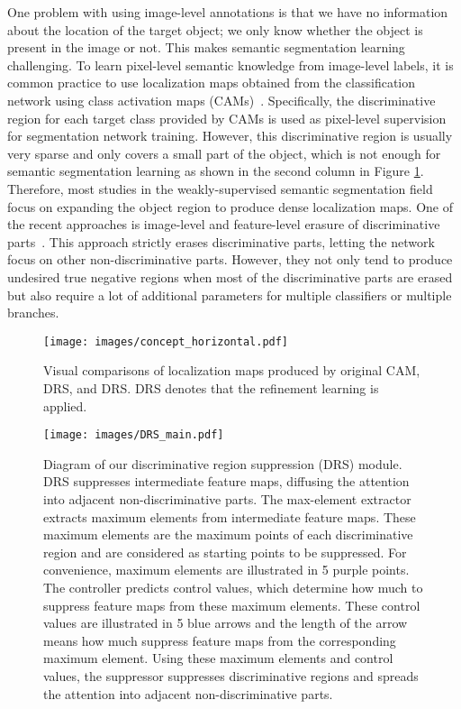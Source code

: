 \documentclass[letterpaper]{article} \usepackage{aaai21}  \usepackage{times}  \usepackage{helvet} \usepackage{courier}  \usepackage[hyphens]{url}  \usepackage{graphicx} \urlstyle{rm} \def\UrlFont{\rm}  \usepackage{natbib}  \usepackage{caption} \frenchspacing  \setlength{\pdfpagewidth}{8.5in}  \setlength{\pdfpageheight}{11in}
\begin{document}
One problem with using image-level annotations is that we have no information about the location of the target object; we only know whether the object is present in the image or not.
This makes semantic segmentation learning challenging.
To learn pixel-level semantic knowledge from image-level labels, it is common practice to use localization maps obtained from the classification network using class activation maps (CAMs)~\cite{zhou2016learning}. 
Specifically, the discriminative region for each target class provided by CAMs is used as pixel-level supervision for segmentation network training.
However, this discriminative region is usually very sparse and only covers a small part of the object, which is not enough for semantic segmentation learning as shown in the second column in Figure \ref{figure:concept}. 
Therefore, most studies in the weakly-supervised semantic segmentation field focus on expanding the object region to produce dense localization maps.
One of the recent approaches is image-level and feature-level erasure of discriminative parts~\cite{wei2017object, li2018tell, hou2018self}.
This approach strictly erases discriminative parts, letting the network focus on other non-discriminative parts.
However, they not only tend to produce undesired true negative regions when most of the discriminative parts are erased but also require a lot of additional parameters for multiple classifiers or multiple branches.


\begin{figure}[t]
    \centering

    \texttt{[image: images/concept\_horizontal.pdf]}
    \caption{Visual comparisons of localization maps produced by original CAM, DRS, and DRS. DRS denotes that the refinement learning is applied.}
    \label{figure:concept}
\end{figure}



\begin{figure*}[t]
    \centering
    \texttt{[image: images/DRS\_main.pdf]}
    \caption{
        Diagram of our discriminative region suppression (DRS) module. DRS suppresses intermediate feature maps, diffusing the attention into adjacent non-discriminative parts.
        The max-element extractor extracts  maximum elements from intermediate feature maps. 
        These  maximum elements are the maximum points of each discriminative region and are considered as starting points to be suppressed.
        For convenience,  maximum elements are illustrated in 5 purple points.
        The controller predicts control values, which determine how much to suppress feature maps from these  maximum elements.
        These  control values are illustrated in 5 blue arrows and the length of the arrow means how much suppress feature maps from the corresponding maximum element.
        Using these  maximum elements and  control values, the suppressor suppresses discriminative regions and spreads the attention into adjacent non-discriminative parts.
    }
    \label{figure:main}
\end{figure*}
\end{document}
